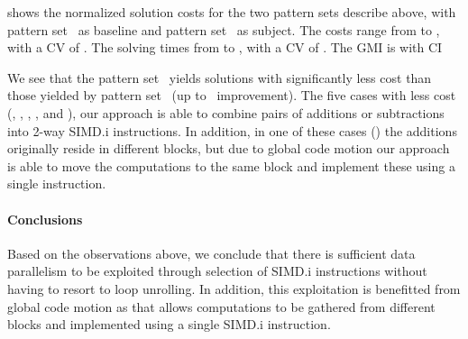  shows the normalized \gls{solution}
costs for the two \glspl{pattern set} describe above, with \gls{pattern
  set}~ as \gls{baseline} and \gls{pattern
  set}~ as \gls{subject}.
%
The costs range from
\printMinCycles{%
  \SimdVsWithoutCyclesSpeedupCyclesAvgMin,
  \SimdVsWithoutCyclesSpeedupBaselineCyclesAvgMin
} to
\printMaxCycles{%
  \SimdVsWithoutCyclesSpeedupCyclesAvgMax,
  \SimdVsWithoutCyclesSpeedupBaselineCyclesAvgMax
}, with a \gls{CV} of
\numMaxOf{
  \SimdVsWithoutCyclesSpeedupCyclesCvMax,
  \SimdVsWithoutCyclesSpeedupBaselineCyclesCvMax
}.
%
The solving times from
\printMinSolvingTime{%
  \SimdVsWithoutCyclesSpeedupPrePlusSolvingTimeAvgMin,
  \SimdVsWithoutCyclesSpeedupBaselinePrePlusSolvingTimeAvgMin
} to
\printMaxSolvingTime{%
  \SimdVsWithoutCyclesSpeedupPrePlusSolvingTimeAvgMax,
  \SimdVsWithoutCyclesSpeedupBaselinePrePlusSolvingTimeAvgMax
}, with a \gls{CV} of
\numMaxOf{
  \SimdVsWithoutCyclesSpeedupPrePlusSolvingTimeCvMax,
  \SimdVsWithoutCyclesSpeedupBaselinePrePlusSolvingTimeCvMax
}.
%
The \gls{GMI} is \printGMI{%
  \SimdVsWithoutCyclesSpeedupCyclesRegularSpeedupGmean%
} with \gls{CI}~\printGMICI{%
  \SimdVsWithoutCyclesSpeedupCyclesRegularSpeedupCiMin%
}{%
  \SimdVsWithoutCyclesSpeedupCyclesRegularSpeedupCiMax%
}

We see that the \gls{pattern set}~ yields \glspl{solution}
with significantly less cost than those yielded by \gls{pattern
  set}~ (up to~\printSpeedup{%
  \SimdVsWithoutCyclesSpeedupCyclesZeroCenteredSpeedupMax%
} improvement).
%
The five cases with less cost (,
, , , and
), our approach is able to combine pairs of additions or
subtractions into \num{2}-way \gls{SIMD.i} \glspl{instruction}.
%
In addition, in one of these cases () the additions
originally reside in different \glspl{block}, but due to \gls{global code
  motion} our approach is able to move the computations to the same \gls{block}
and implement these using a single \gls{instruction}.


\paragraph{Conclusions}

Based on the observations above, we conclude that there is sufficient data
parallelism to be exploited through selection of \gls{SIMD.i}
\glspl{instruction} without having to resort to \gls{loop unrolling}.
%
In addition, this exploitation is benefitted from \gls{global code motion} as
that allows computations to be gathered from different \glspl{block} and
implemented using a single \gls{SIMD.i} \gls{instruction}.
